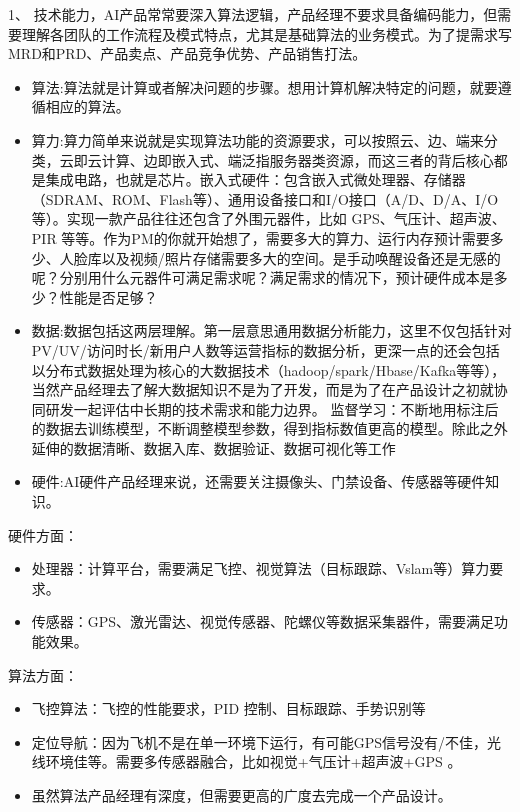 \documentclass[letterpaper,11pt,english]{sphinxmanual}
\begin{document}
1、
技术能力，AI产品常常要深入算法逻辑，产品经理不要求具备编码能力，但需要理解各团队的工作流程及模式特点，尤其是基础算法的业务模式。为了提需求写MRD和PRD、产品卖点、产品竞争优势、产品销售打法。
\begin{itemize}
\item {} 
算法:算法就是计算或者解决问题的步骤。想用计算机解决特定的问题，就要遵循相应的算法。

\item {} 
算力:算力简单来说就是实现算法功能的资源要求，可以按照云、边、端来分类，云即云计算、边即嵌入式、端泛指服务器类资源，而这三者的背后核心都是集成电路，也就是芯片。嵌入式硬件：包含嵌入式微处理器、存储器（SDRAM、ROM、Flash等）、通用设备接口和I/O接口（A/D、D/A、I/O等）。实现一款产品往往还包含了外围元器件，比如
GPS、气压计、超声波、PIR
等等。作为PM的你就开始想了，需要多大的算力、运行内存预计需要多少、人脸库以及视频/照片存储需要多大的空间。是手动唤醒设备还是无感的呢？分别用什么元器件可满足需求呢？满足需求的情况下，预计硬件成本是多少？性能是否足够？

\item {} 
数据:数据包括这两层理解。第一层意思通用数据分析能力，这里不仅包括针对PV/UV/访问时长/新用户人数等运营指标的数据分析，更深一点的还会包括以分布式数据处理为核心的大数据技术（hadoop/spark/Hbase/Kafka等等），当然产品经理去了解大数据知识不是为了开发，而是为了在产品设计之初就协同研发一起评估中长期的技术需求和能力边界。
监督学习：不断地用标注后的数据去训练模型，不断调整模型参数，得到指标数值更高的模型。除此之外延伸的数据清晰、数据入库、数据验证、数据可视化等工作

\item {} 
硬件:AI硬件产品经理来说，还需要关注摄像头、门禁设备、传感器等硬件知识。

\end{itemize}


硬件方面：
\begin{itemize}
\item {} 
处理器：计算平台，需要满足飞控、视觉算法（目标跟踪、Vslam等）算力要求。

\item {} 
传感器：GPS、激光雷达、视觉传感器、陀螺仪等数据采集器件，需要满足功能效果。

\end{itemize}

算法方面：
\begin{itemize}
\item {} 
飞控算法：飞控的性能要求，PID 控制、目标跟踪、手势识别等

\item {} 
定位导航：因为飞机不是在单一环境下运行，有可能GPS信号没有/不佳，光线环境佳等。需要多传感器融合，比如视觉+气压计+超声波+GPS
。

\item {} 
虽然算法产品经理有深度，但需要更高的广度去完成一个产品设计。

\end{itemize}
\end{document}
